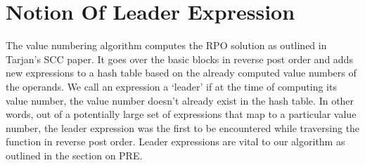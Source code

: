 \section{Notion Of Leader Expression}  
The value numbering algorithm computes the RPO solution as outlined in Tarjan's
SCC paper\cite{Cooper95scc-basedvalue}. It goes over the basic blocks in
reverse post order and adds new expressions to a hash table based on the
already computed value numbers of the operands. We call an expression a
`leader' if at the time of computing its value number, the value number doesn't
already exist in the hash table. In other words, out of a potentially large set of
expressions that map to a particular value number, the leader expression was
the first to be encountered while traversing the function in reverse post
order. Leader expressions are vital to our algorithm as outlined in the section
on PRE.
